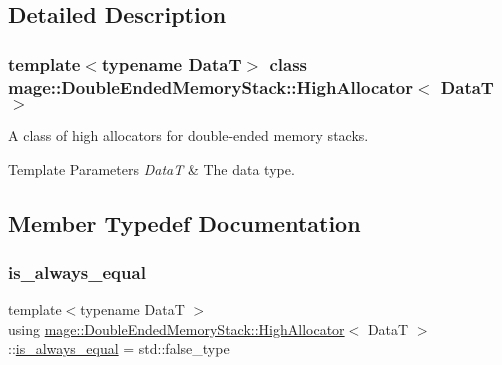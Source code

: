 \subsection{Detailed Description}
\subsubsection*{template$<$typename DataT$>$\newline
class mage\+::\+Double\+Ended\+Memory\+Stack\+::\+High\+Allocator$<$ Data\+T $>$}

A class of high allocators for double-\/ended memory stacks.


\begin{DoxyTemplParams}{Template Parameters}
{\em DataT} & The data type. \\
\hline
\end{DoxyTemplParams}


\subsection{Member Typedef Documentation}
\hypertarget{classmage_1_1_double_ended_memory_stack_1_1_high_allocator_af6ec362496ffae52532f1bb57170edf7}{}\label{classmage_1_1_double_ended_memory_stack_1_1_high_allocator_af6ec362496ffae52532f1bb57170edf7} 
\subsubsection{\texorpdfstring{is\+\_\+always\+\_\+equal}{is\_always\_equal}}
{\footnotesize\ttfamily template$<$typename DataT $>$ \\
using \hyperlink{classmage_1_1_double_ended_memory_stack_1_1_high_allocator}{mage\+::\+Double\+Ended\+Memory\+Stack\+::\+High\+Allocator}$<$ DataT $>$\+::\hyperlink{classmage_1_1_double_ended_memory_stack_1_1_high_allocator_af6ec362496ffae52532f1bb57170edf7}{is\+\_\+always\+\_\+equal} =  std\+::false\+\_\+type}

\hypertarget{classmage_1_1_double_ended_memory_stack_1_1_high_allocator_a62088aeffb56b35539d9080aabc43134}{}\label{classmage_1_1_double_ended_memory_stack_1_1_high_allocator_a62088aeffb56b35539d9080aabc43134} 
